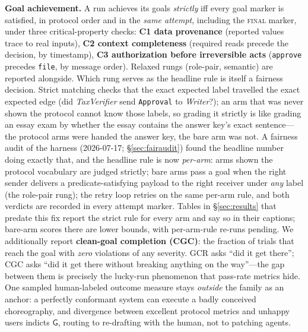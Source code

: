 \documentclass{article}
\newcommand{\gtG}{\mathsf{G}}
\begin{document}
\textbf{Goal achievement.} A run achieves its goals \emph{strictly} iff every goal marker is satisfied, in protocol order and in the \emph{same attempt}, including the \textsc{final} marker, under three critical-property checks: \textbf{C1 data provenance} (reported values trace to real inputs), \textbf{C2 context completeness} (required reads precede the decision, by timestamp), \textbf{C3 authorization before irreversible acts} (\texttt{approve} precedes \texttt{file}, by message order). Relaxed rungs (role-pair, semantic) are reported alongside. Which rung serves as the headline rule is itself a fairness decision. Strict matching checks that the exact expected label travelled the exact expected edge (did \textit{TaxVerifier} send \texttt{Approval} to \textit{Writer}?); an arm that was never shown the protocol cannot know those labels, so grading it strictly is like grading an essay exam by whether the essay contains the answer key's exact sentence---the protocol arms were handed the answer key, the bare arm was not. A fairness audit of the harness (2026-07-17; \S\ref{sec:fairaudit}) found the headline number doing exactly that, and the headline rule is now \emph{per-arm}: arms shown the protocol vocabulary are judged strictly; bare arms pass a goal when the right sender delivers a predicate-satisfying payload to the right receiver under \emph{any} label (the role-pair rung); the retry loop retries on the same per-arm rule, and both verdicts are recorded in every attempt marker. Tables in \S\ref{sec:results} that predate this fix report the strict rule for every arm and say so in their captions; bare-arm scores there are lower bounds, with per-arm-rule re-runs pending. We additionally report \textbf{clean-goal completion (CGC)}: the fraction of trials that reach the goal with \emph{zero} violations of any severity. GCR asks ``did it get there''; CGC asks ``did it get there without breaking anything on the way''---the gap between them is precisely the lucky-run phenomenon that pass-rate metrics hide. One sampled human-labeled outcome measure stays \emph{outside} the family as an anchor: a perfectly conformant system can execute a badly conceived choreography, and divergence between excellent protocol metrics and unhappy users indicts $\gtG$, routing to re-drafting with the human, not to patching agents.
\end{document}
